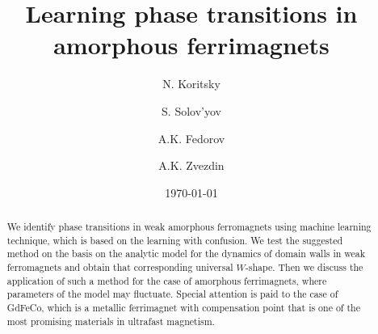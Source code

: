 \documentclass[aps,pra,twocolumn,amsmath,amssymb,nofootinbib,showpacs,superscriptaddress]{revtex4-1}
\theoremstyle{remark}
\begin{document}

    \title{Learning phase transitions in amorphous ferrimagnets}

    \author{N. Koritsky}

    \author{S. Solov'yov}

    \author{A.K. Fedorov}

    \author{A.K. Zvezdin}

    \date{\today}
    \begin{abstract}
        We identify phase transitions in weak amorphous ferromagnets using machine learning technique, which is based on the learning with confusion.
        We test the suggested method on the basis on the analytic model for the dynamics of domain walls in weak ferromagnets and obtain that corresponding universal $W$-shape.
        Then we discuss the application of such a method for the case of amorphous ferrimagnets, where parameters of the model may fluctuate.
        Special attention is paid to the case of GdFeCo, which is a metallic ferrimagnet with compensation point that is one of the most promising materials in ultrafast magnetism.
    \end{abstract}

    \maketitle
    
    

    
    
\end{document}
